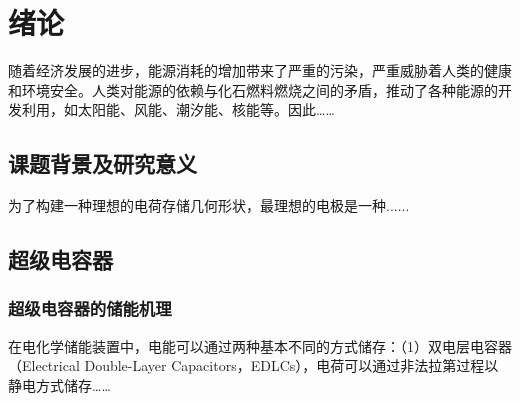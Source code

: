 \chapter{绪论}
随着经济发展的进步，能源消耗的增加带来了严重的污染，严重威胁着人类的健康和环境安全。人类对能源的依赖与化石燃料燃烧之间的矛盾，推动了各种能源的开发利用，如太阳能、风能、潮汐能、核能等。因此……

\section{课题背景及研究意义} 
为了构建一种理想的电荷存储几何形状，最理想的电极是一种......

\section{超级电容器}
\subsection{超级电容器的储能机理}
在电化学储能装置中，电能可以通过两种基本不同的方式储存：（1）双电层电容器（Electrical Double-Layer Capacitors，EDLCs），电荷可以通过非法拉第过程以静电方式储存…… 
